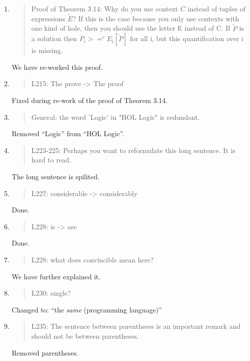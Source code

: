 \begin{enumerate}
\item \begin{quote}
    Proof of Theorem 3.14: Why do you use context $C$ instead of tuples of expressions $\tilde{E}$?
    If this is the case because you only use contexts with one kind of hole, then you should use the letter
    E instead of C.
    If $\tilde{P}$ is a solution then $P_i >=^c E_i[\tilde{P}]$ for all i, but this quantification over i is missing.
  \end{quote}
  We have  re-worked this proof.

\item \begin{quote}
    L215: The prove -> The proof
  \end{quote}
  Fixed during re-work of the proof of Theorem 3.14.
  
\item \begin{quote}
    General: the word 'Logic' in "HOL Logic" is redundant.
  \end{quote}
  Removed ``Logic'' from ``HOL Logic''.
  
\item \begin{quote}
    L223-225: Perhaps you want to reformulate this long sentence. It is hard to read.
  \end{quote}
  The long sentence is spilited.
  
\item \begin{quote}
    L227: considerable -> considerably
  \end{quote}
  Done.
 
\item \begin{quote}
    L228: is -> are
  \end{quote}
  Done.
  
\item \begin{quote}
    L228: what does convincible mean here?
  \end{quote}
  We have further explained it.
  
\item \begin{quote}
    L230: single?
  \end{quote}
  Changed to: ``the \emph{same} (programming language)''
  
\item \begin{quote}
    L235: The sentence between parentheses is an important remark and
    should not be between parentheses.
  \end{quote}
  Removed parentheses.
  

\end{enumerate}
